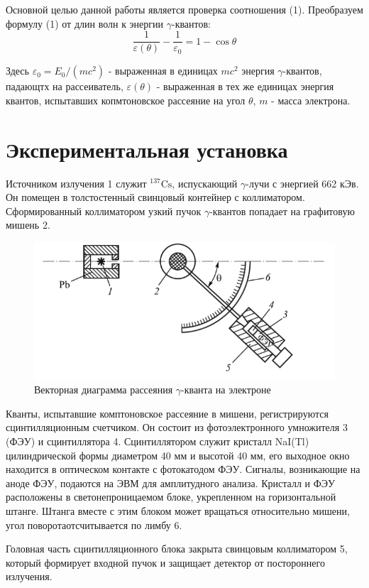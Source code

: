 \documentclass[a4paper,12pt]{article}
\begin{document}
Основной целью данной работы является проверка соотношения (1). Преобразуем формулу (1) от длин волн к энергии $\gamma$-квантов:
\begin{equation}
    \frac{1}{\varepsilon(\theta)}-\frac{1}{\varepsilon_0}=1-\cos{\theta}
\end{equation}

Здесь $\varepsilon_0=E_0/(mc^2)$ - выраженная в единицах $mc^2$ энергия $\gamma$-квантов, падающтх на рассеиватель, $\varepsilon(\theta)$ - выраженная в тех же единицах энергия квантов, испытавших копмтоновское рассеяние на угол $\theta$, $m$ - масса электрона.

\section{Экспериментальная установка}

Источником излучения 1 служит $^{137}\text{Cs}$, испускающий $\gamma$-лучи с энергией 662 кЭв. Он помещен в толстостенный свинцовый контейнер с коллиматором. Сформированный коллиматором узкий пучок $\gamma$-квантов попадает на графитовую мишень 2.

\begin{figure}[h]
\centering
\includegraphics[width=0.4\linewidth]{img2.png}
\caption{Векторная диаграмма рассеяния $\gamma$-кванта на электроне}
\label{img2}
\end{figure}

Кванты, испытавшие комптоновское рассеяние в мишени, регистрируются сцинтилляционным счетчиком. Он состоит из фотоэлектронного умножителя 3 (ФЭУ) и сцинтиллятора 4. Сцинтиллятором служит кристалл NaI(Tl) цилиндрической формы диаметром 40 мм и высотой 40 мм, его выходное окно находится в оптическом контакте с фотокатодом ФЭУ. Сигналы, возникающие на аноде ФЭУ, подаются на ЭВМ для амплитудного анализа. Кристалл и ФЭУ расположены в светонепроницаемом блоке, укрепленном на горизонтальной штанге. Штанга вместе с этим блоком может вращаться относительно мишени, угол поворотаотсчитывается по лимбу 6.

Головная часть сцинтилляционного блока закрыта свинцовым коллиматором 5, который формирует входной пучок и защищает детектор от постороннего излучения.
\end{document}
